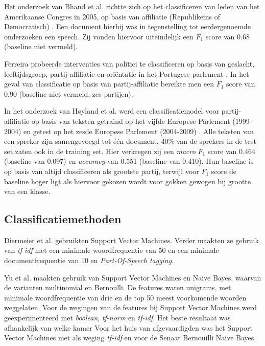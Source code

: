Het onderzoek van Bhand et al. richtte zich op het classificeren van leden van het Amerikaanse Congres in 2005, op basis van affiliatie (Republikeins of Democratisch) \cite{bhand}. Een document hierbij was in tegenstelling tot eerdergenoemde onderzoeken een speech. Zij vonden hiervoor uiteindelijk een $F_1$ score van 0.68 (baseline niet vermeld).\par

Ferreira probeerde interventies van politici te classificeren op basis van geslacht, leeftijdsgroep, partij-affiliatie en oriëntatie in het Portugese parlement \cite{Ferreira2016UsingTT}. In het geval van classificatie op basis van partij-affiliatie bereikte men een $F_1$ score van 0.90 (baseline niet vermeld, zes partijen).\par

In het onderzoek van Høyland et al. werd een classificatiemodel voor partij-affiliatie op basis van teksten getraind op het vijfde Europese Parlement (1999-2004) en getest op het zesde Europese Parlement (2004-2009) \cite{W14-2516}. Alle teksten van een spreker zijn samengevoegd tot één document. 40\% van de sprekers in de test set zaten ook in de training set. Hier verkregen zij een \textit{macro} $F_1$ score van 0.464 (baseline van 0.097) en \textit{accuracy} van 0.551 (baseline van 0.410). Hun baseline is op basis van altijd classificeren als grootste partij, terwijl voor $F_1$ score de baseline hoger ligt als hiervoor gekozen wordt voor gokken gewogen bij grootte van een klasse. \par

\subsection{Classificatiemethoden}
\label{sec:Deelvraag1}
Diermeier et al. \cite{diermeier_godbout_yu_kaufmann_2012} gebruikten Support Vector Machines. Verder maakten ze gebruik van \textit{tf-idf} met een minimale woordfrequentie van 50 en een minimale documentfrequentie van 10 en \textit{Part-Of-Speech tagging}.\par
Yu et al. \cite{doi:10.1080/19331680802149608} maakten gebruik van Support Vector Machines en Naive Bayes, waarvan de varianten multinomial en Bernoulli. De features waren unigrams, met minimale woordfrequentie van drie en de top 50 meest voorkomende woorden weggelaten. Voor de wegingen van de features bij Support Vector Machines werd geëxperimenteerd met \textit{boolean}, \textit{tf-norm} en \textit{tf-idf}. Het beste resultaat was afhankelijk van welke kamer Voor het huis van afgevaardigden was het Support Vector Machines met als weging \textit{tf-idf} en voor de Senaat Bernouilli Naive Bayes.


